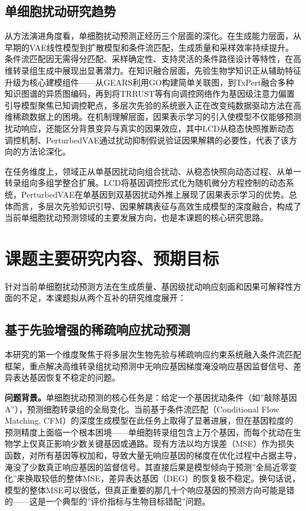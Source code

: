 \subsection{单细胞扰动研究趋势}

从方法演进角度看，单细胞扰动预测正经历三个层面的深化。在生成能力层面，从早期的VAE线性模型到扩散模型和条件流匹配，生成质量和采样效率持续提升。条件流匹配因无需得分匹配、采样确定性、支持灵活的条件路径设计等特性，在高维转录组生成中展现出显著潜力。在知识融合层面，先验生物学知识正从辅助特征升级为核心建模组件——从GEARS利用GO构建简单关联图，到TxPert融合多种知识图谱的异质图编码，再到将TRRUST等有向调控网络作为基因级注意力偏置引导模型聚焦已知调控靶点，多层次先验的系统嵌入正在改变纯数据驱动方法在高维稀疏数据上的困境。在机制理解层面，因果表示学习的引入使模型不仅能够预测扰动响应，还能区分背景变异与真实的因果效应，其中LCD从稳态快照推断动态调控机制、PerturbedVAE通过扰动抑制假说验证因果解耦的必要性，代表了该方向的方法论深化。

在任务维度上，领域正从单基因扰动向组合扰动、从稳态快照向动态过程、从单一转录组向多组学整合扩展。LCD将基因调控形式化为随机微分方程控制的动态系统\cite{lorch2025latent}，PerturbedVAE在单基因到双基因扰动外推上展现了因果表示学习的优势\cite{jiang2025what}。总体而言，多层次先验知识引导、因果解耦表征与高效生成模型的深度融合，构成了当前单细胞扰动预测领域的主要发展方向，也是本课题的核心研究思路。

\clearpage
\section{课题主要研究内容、预期目标}

针对当前单细胞扰动预测方法在生成质量、基因级扰动响应刻画和因果可解释性方面的不足，本课题拟从两个互补的研究维度展开：

\subsection{基于先验增强的稀疏响应扰动预测}

本研究的第一个维度聚焦于将多层次生物先验与稀疏响应约束系统融入条件流匹配框架，重点解决高维转录组扰动预测中无响应基因梯度淹没响应基因监督信号、差异表达基因恢复不稳定的问题。

\textbf{问题背景。}单细胞扰动预测的核心任务是：给定一个基因扰动条件（如”敲除基因A”），预测细胞转录组的全局变化。当前基于条件流匹配（Conditional Flow Matching, CFM）的深度生成模型在此任务上取得了显著进展，但在基因粒度的预测精度上面临一个根本困境——单细胞转录组包含上万个基因，而每个扰动在生物学上仅真正影响少数关键基因或通路。现有方法以均方误差（MSE）作为损失函数，对所有基因等权加和，导致大量无响应基因的梯度在优化过程中占据主导，淹没了少数真正响应基因的监督信号。其直接后果是模型倾向于预测”全局近零变化”来换取较低的整体MSE，差异表达基因（DEG）的恢复极不稳定。换句话说，模型的整体MSE可以很低，但真正重要的那几十个响应基因的预测方向可能是错的——这是一个典型的”评价指标与生物目标错配”问题。

